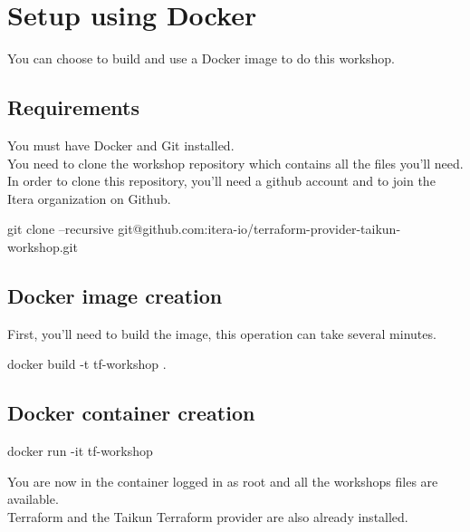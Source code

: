 \section{Setup using Docker}\label{sec:docker}

You can choose to build and use a Docker image to do this workshop.

\subsection{Requirements}

You must have Docker and Git installed.\\
You need to clone the workshop repository which contains all the files you'll need.\\
In order to clone this repository, you'll need a github account and to join the Itera organization on Github.

\begin{shell}
git clone --recursive git@github.com:itera-io/terraform-provider-taikun-workshop.git
\end{shell}

\subsection{Docker image creation}

First, you'll need to build the image, this operation can take several minutes.

\begin{shell}
docker build -t tf-workshop .
\end{shell}

\subsection{Docker container creation}

\begin{shell}
docker run -it tf-workshop
\end{shell}
You are now in the container logged in as root and all the workshops files are available.\\
Terraform and the Taikun Terraform provider are also already installed.

